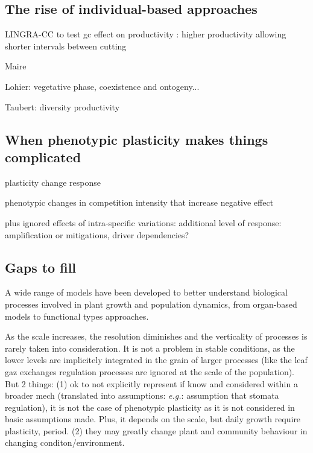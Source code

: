 \subsection{The rise of individual-based approaches}

LINGRA-CC \cite{rodriguez_lingra-cc:_1999} to test gc effect on productivity : higher productivity allowing shorter intervals between cutting

Maire

Lohier: vegetative phase, coexistence and ontogeny... 

Taubert: diversity productivity 


\subsection{When phenotypic plasticity makes things complicated}

plasticity change response \cite{morin_comparing_2009}

phenotypic changes in competition intensity that increase negative effect \parencite{hanel_phenotypic_2015}

plus ignored effects of intra-specific variations: additional level of response: amplification or mitigations, driver dependencies?

\subsection{Gaps to fill}

A wide range of models have been developed to better understand biological processes involved in plant growth and population dynamics, from organ-based models to functional types approaches.

As the scale increases, the resolution diminishes and the verticality of processes is rarely taken into consideration. It is not a problem in stable conditions, as the lower levels are implicitely integrated in the grain of larger processes (like the leaf gaz exchanges regulation processes are ignored at the scale of the population). But 2 things:
(1) ok to not explicitly represent if know and considered within a broader mech (translated into assumptions: \textit{e.g.}: assumption that stomata regulation), it is not the case of phenotypic plasticity as it is not considered in basic assumptions made. Plus, it depends on the scale, but daily growth require plasticity, period.
(2) they may greatly change plant and community behaviour in changing conditon/environment.
 
